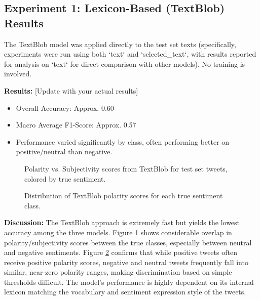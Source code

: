 \documentclass[10pt,twocolumn]{article}
\begin{document}
\subsection{Experiment 1: Lexicon-Based (TextBlob) Results}
\label{subsec:exp_lexicon}

The TextBlob model was applied directly to the test set texts (specifically, experiments were run using both `text` and `selected_text`, with results reported for analysis on `text` for direct comparison with other models). No training is involved. %

\textbf{Results:} [Update with your actual results]
\begin{itemize}[itemsep=0pt, topsep=3pt]
    \item Overall Accuracy: Approx. 0.60
    \item Macro Average F1-Score: Approx. 0.57
    \item Performance varied significantly by class, often performing better on positive/neutral than negative.
\end{itemize}

\begin{figure}[H]
    \centering
    \caption{Polarity vs. Subjectivity scores from TextBlob for test set tweets, colored by true sentiment.}
    \label{fig:lex_polarity_subj}
\end{figure}

\begin{figure}[H]
    \centering
    \caption{Distribution of TextBlob polarity scores for each true sentiment class.}
    \label{fig:lex_polarity_dist}
\end{figure}

\textbf{Discussion:} The TextBlob approach is extremely fast but yields the lowest accuracy among the three models. Figure \ref{fig:lex_polarity_subj} shows considerable overlap in polarity/subjectivity scores between the true classes, especially between neutral and negative sentiments. Figure \ref{fig:lex_polarity_dist} confirms that while positive tweets often receive positive polarity scores, negative and neutral tweets frequently fall into similar, near-zero polarity ranges, making discrimination based on simple thresholds difficult. The model's performance is highly dependent on its internal lexicon matching the vocabulary and sentiment expression style of the tweets.
\end{document}
